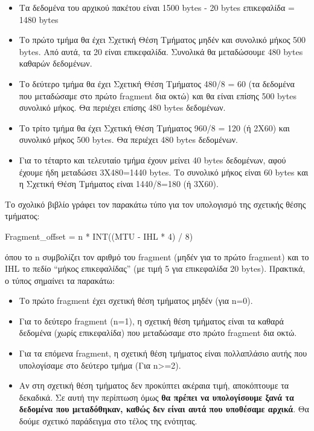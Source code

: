 \begin{itemize}
\begin{itemize}
\item Τα δεδομένα του αρχικού πακέτου είναι 1500 bytes - 20 bytes επικεφαλίδα = 1480 bytes
\item Το πρώτο τμήμα θα έχει Σχετική Θέση Τμήματος μηδέν και συνολικό μήκος 500 bytes. Από αυτά, τα 20 είναι επικεφαλίδα. Συνολικά θα μεταδώσουμε 480 bytes καθαρών δεδομένων.
\item Το δεύτερο τμήμα θα έχει Σχετική Θέση Τμήματος 480/8 = 60 (τα δεδομένα που μεταδώσαμε στο πρώτο fragment δια οκτώ) και θα είναι επίσης 500 bytes συνολικό μήκος. Θα περιέχει επίσης 480 bytes δεδομένων.
\item Το τρίτο τμήμα θα έχει Σχετική Θέση Τμήματος 960/8 = 120 (ή 2Χ60) και συνολικό μήκος 500 bytes. Θα περιέχει 480 bytes δεδομένων.
\item Για το τέταρτο και τελευταίο τμήμα έχουν μείνει 40 bytes δεδομένων, αφού έχουμε ήδη μεταδώσει 3Χ480=1440 bytes. Το συνολικό μήκος είναι 60 bytes και η Σχετική Θέση Τμήματος είναι 1440/8=180 (ή 3Χ60).
\end{itemize}   

Το σχολικό βιβλίο γράφει τον παρακάτω τύπο για τον υπολογισμό της σχετικής θέσης τμήματος:

\begin{center}
Fragment\_offset = n * INT((MTU - IHL * 4) / 8)
\end{center}

όπου το n συμβολίζει τον αριθμό του fragment (μηδέν για το πρώτο fragment) και το IHL το πεδίο ``μήκος επικεφαλίδας'' (με τιμή 5 για επικεφαλίδα 20 bytes). Πρακτικά, ο τύπος σημαίνει τα παρακάτω:

\begin{itemize}
\item Το πρώτο fragment έχει σχετική θέση τμήματος μηδέν (για n=0).
\item Για το δεύτερο fragment (n=1), η σχετική θέση τμήματος είναι τα καθαρά δεδομένα (χωρίς επικεφαλίδα) που μεταδώσαμε στο πρώτο fragment δια οκτώ.
\item Για τα επόμενα fragment, η σχετική θέση τμήματος είναι πολλαπλάσιο αυτής που υπολογίσαμε στο δεύτερο τμήμα (Για n>=2).
\item Αν στη σχετική θέση τμήματος δεν προκύπτει ακέραια τιμή, αποκόπτουμε τα δεκαδικά. Σε αυτή την περίπτωση όμως \textbf{θα πρέπει να υπολογίσουμε ξανά τα δεδομένα που μεταδόθηκαν, καθώς δεν είναι αυτά που υποθέσαμε αρχικά}. Θα δούμε σχετικό παράδειγμα στο τέλος της ενότητας.
\end{itemize}


\end{itemize}
